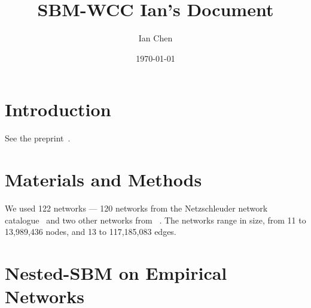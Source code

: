 \documentclass[aps,pre,superscriptaddress]{revtex4}
\begin{document}

\title{SBM-WCC Ian's Document}
\author{Ian Chen}
\noaffiliation
\date{\today}
\maketitle

\section{Introduction}
See the preprint~\cite{Park25-02}.

\section{Materials and Methods}

We used 122 networks --- 120 networks from the Netzschleuder network catalogue~\cite{Netzschleuder} and two other networks from ~\cite{Park24-11}.
The networks range in size, from 11 to 13,989,436 nodes, and 13 to 117,185,083 edges.

\section{Nested-SBM on Empirical Networks}
\end{document}
